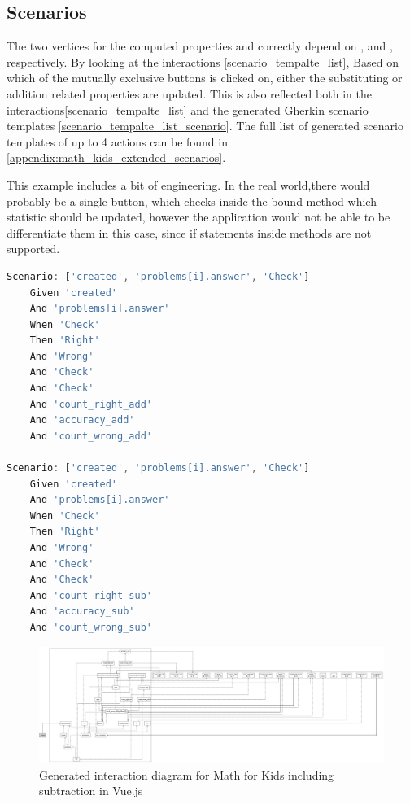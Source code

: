 \subsection{Scenarios}

The two vertices for the computed properties  and  correctly depend on ,  and ,  respectively. By looking at the interactions \ref{scenario_tempalte_list}, 
Based on which of the mutually exclusive  buttons is clicked on, either the substituting or addition related properties are updated. This is also reflected both in the interactions\ref{scenario_tempalte_list} and the generated Gherkin scenario templates \ref{scenario_tempalte_list_scenario}. The full list of generated scenario templates of up to 4 actions can be found in \ref{appendix:math_kids_extended_scenarios}.

This example includes a bit of engineering. In the real world,there would probably be a single button, which checks inside the bound method which statistic should be updated, however the application would not be able to be differentiate them in this case, since if statements inside methods are not supported.

\newpage
\label{scenario_tempalte_list_scenario}
\begin{lstlisting}[language=JavaScript]
Scenario: ['created', 'problems[i].answer', 'Check']
	Given 'created'
	And 'problems[i].answer'
	When 'Check'
	Then 'Right'
	And 'Wrong'
	And 'Check'
	And 'Check'
	And 'count_right_add'
	And 'accuracy_add'
    And 'count_wrong_add'

Scenario: ['created', 'problems[i].answer', 'Check']
	Given 'created'
	And 'problems[i].answer'
	When 'Check'
	Then 'Right'
	And 'Wrong'
	And 'Check'
	And 'Check'
	And 'count_right_sub'
	And 'accuracy_sub'
	And 'count_wrong_sub'
\end{lstlisting}

\begin{figure}[H]
    \centering
    \includegraphics[width=\textwidth]{images/diagram_list_add_sub.png}
     \caption{Generated interaction diagram for Math for Kids including subtraction in Vue.js}
     \label{fig:diagram_list_complex}
\end{figure}


